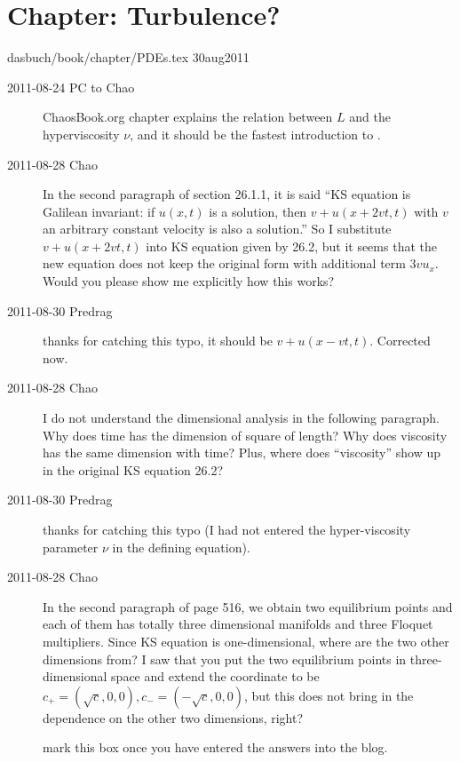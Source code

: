 \section{Chapter: Turbulence?}
\label{c-PDEs}\noindent dasbuch/book/chapter/PDEs.tex 30aug2011
\begin{description}


\item[2011-08-24 PC to Chao] ChaosBook.org chapter
explains the relation between $L$ and the hyperviscosity
$\nu$, and it should be the fastest introduction to \KSe.

\item[2011-08-28 Chao]

In the second paragraph of section 26.1.1, it is said ``KS equation is
Galilean invariant: if $u(x,t)$ is a solution, then $v+u(x+2vt,t)$ with
$v$ an arbitrary constant velocity is also a solution.'' So I substitute
$v+u(x+2vt,t)$ into KS equation given by 26.2, but it seems that the new
equation does not keep the original form with additional term $3vu_x$.
Would you please show me explicitly how this works?

\item[2011-08-30 Predrag] thanks for catching this typo, it should be
$v+u(x-vt,t)$. Corrected now.

\item[2011-08-28 Chao]
I do not understand the dimensional analysis in the following
paragraph. Why does time has the dimension of square of length? Why does
viscosity has the same dimension with time? Plus, where does
``viscosity'' show up in the original KS equation 26.2?

\item[2011-08-30 Predrag] thanks for catching this typo (I had not
entered the hyper-viscosity parameter $\nu$ in the defining equation).

\item[2011-08-28 Chao]
In the second paragraph of page 516, we obtain two equilibrium points and
each of them has totally three dimensional manifolds and three Floquet
multipliers. Since KS equation is one-dimensional, where are the two
other dimensions from? I saw that you put the two equilibrium points in
three-dimensional space and extend the coordinate to be $c_+ =
(\sqrt{c},0,0),c_- = (-\sqrt{c},0,0)$, but this does not bring in the
dependence on the other two dimensions, right?

 mark this box once you have entered the
answers into the blog.


\end{description}

